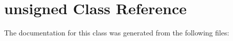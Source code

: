 \hypertarget{classunsigned}{}\section{unsigned Class Reference}
\label{classunsigned}


The documentation for this class was generated from the following files\+: